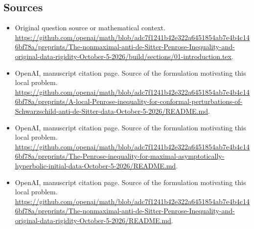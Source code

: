 \documentclass[11pt]{article}
\begin{document}
\subsection{Sources}
\begin{itemize}
\item[S1] Original question source or mathematical context.
\url{https://github.com/openai/math/blob/adc7f1241b42e322a6451854ab7e4b4c146bf78a/preprints/The-nonmaximal-anti-de-Sitter-Penrose-Inequality-and-original-data-rigidity-October-5-2026/build/sections/01-introduction.tex}.
\item[S2] OpenAI, manuscript citation page. Source of the formulation motivating this local problem.
\url{https://github.com/openai/math/blob/adc7f1241b42e322a6451854ab7e4b4c146bf78a/preprints/A-local-Penrose-inequality-for-conformal-perturbations-of-Schwarzschild-anti-de-Sitter-data-October-5-2026/README.md}.
\item[S3] OpenAI, manuscript citation page. Source of the formulation motivating this local problem.
\url{https://github.com/openai/math/blob/adc7f1241b42e322a6451854ab7e4b4c146bf78a/preprints/The-Penrose-inequality-for-maximal-asymptotically-hyperbolic-initial-data-October-5-2026/README.md}.
\item[S4] OpenAI, manuscript citation page. Source of the formulation motivating this local problem.
\url{https://github.com/openai/math/blob/adc7f1241b42e322a6451854ab7e4b4c146bf78a/preprints/The-nonmaximal-anti-de-Sitter-Penrose-Inequality-and-original-data-rigidity-October-5-2026/README.md}.
\end{itemize}
\end{document}
